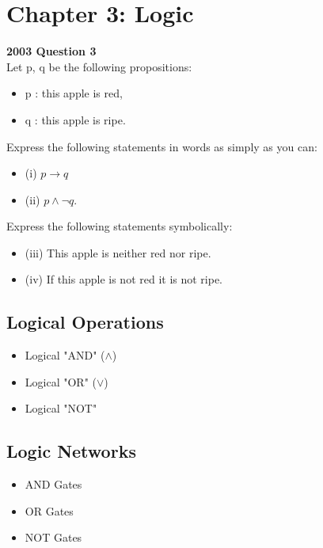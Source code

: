 \section{Chapter 3: Logic}

\textbf{2003 Question 3}\\
Let p, q be the following propositions:
\begin{itemize}
\item p : this apple is red, 
\item q : this apple is ripe.
\end{itemize}

Express the following statements in words as simply as you can:
\begin{itemize}
\item (i) $p \rightarrow q$
\item (ii) $p \wedge \neg q$.
\end{itemize}

 
Express the following statements symbolically:
\begin{itemize}
\item (iii) This apple is neither red nor ripe.
\item (iv) If this apple is not red it is not ripe.
\end{itemize}



\subsection{Logical Operations}

\begin{itemize}
\item Logical "AND" ($\wedge$)
\item Logical "OR" ($\vee$)
\item Logical "NOT" 
\end{itemize}
\newpage

\subsection*{Logic Networks}
\begin{itemize}
\item AND Gates
\item OR Gates
\item NOT Gates
\end{itemize}


